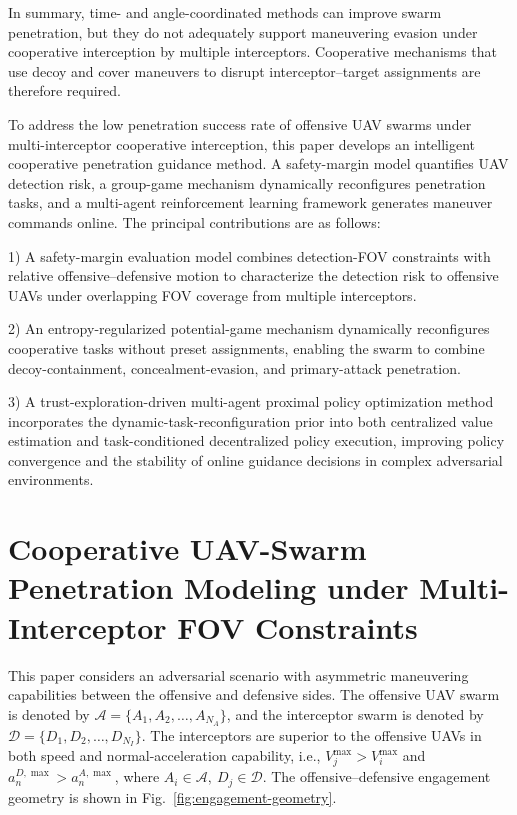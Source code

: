 \documentclass{cja}
\begin{document}
In summary, time- and angle-coordinated methods can improve swarm penetration, but they do not adequately support maneuvering evasion under cooperative interception by multiple interceptors. Cooperative mechanisms that use decoy and cover maneuvers to disrupt interceptor--target assignments are therefore required.

To address the low penetration success rate of offensive UAV swarms under multi-interceptor cooperative interception, this paper develops an intelligent cooperative penetration guidance method. A safety-margin model quantifies UAV detection risk, a group-game mechanism dynamically reconfigures penetration tasks, and a multi-agent reinforcement learning framework generates maneuver commands online. The principal contributions are as follows:

1) A safety-margin evaluation model combines detection-FOV constraints with relative offensive--defensive motion to characterize the detection risk to offensive UAVs under overlapping FOV coverage from multiple interceptors.

2) An entropy-regularized potential-game mechanism dynamically reconfigures cooperative tasks without preset assignments, enabling the swarm to combine decoy-containment, concealment-evasion, and primary-attack penetration.

3) A trust-exploration-driven multi-agent proximal policy optimization method incorporates the dynamic-task-reconfiguration prior into both centralized value estimation and task-conditioned decentralized policy execution, improving policy convergence and the stability of online guidance decisions in complex adversarial environments.

\section{Cooperative UAV-Swarm Penetration Modeling under Multi-Interceptor FOV Constraints}
\label{sec:aircraft-model}

This paper considers an adversarial scenario with asymmetric maneuvering capabilities between the offensive and defensive sides. The offensive UAV swarm is denoted by $\mathcal{A}=\{A_1,A_2,\dots,A_{N_A}\}$, and the interceptor swarm is denoted by $\mathcal{D}=\{D_1,D_2,\dots,D_{N_I}\}$.
The interceptors are superior to the offensive UAVs in both speed and normal-acceleration capability, i.e., $V_j^{\max}>V_i^{\max}$ and $a_n^{D,\max}>a_n^{A,\max}$, where $A_i\in\mathcal A,\ D_j\in\mathcal D$.
The offensive--defensive engagement geometry is shown in Fig.~\ref{fig:engagement-geometry}.
\end{document}
